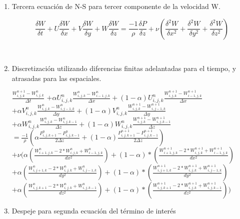 \documentclass[a4paper]{article}
\begin{document}
\begin{enumerate}

\item Tercera ecuación de N-S para tercer componente de la velocidad W.

$$ \frac{\delta W}{\delta t} + U \frac{\delta W}{\delta x} + V \frac{\delta W}{\delta y} + W \frac{\delta W}{\delta z} =  \frac{-1}{\rho} \frac{\delta P}{\delta z} + \nu (\frac{{\delta}^{2} W}{\delta {x}^{2}} + \frac{{\delta}^{2} W}{\delta {y}^{2}} + \frac{{\delta}^{2} W}{\delta {z}^{2}}) $$

~\\

\item Discretización utilizando diferencias finitas adelantadas para el tiempo, y atrasadas para las espaciales.

$ \frac{ {W}^{n+1}_{i,j,k} - W^{n}_{i,j,k}}{ \Delta t} $
$+ \alpha {U}^{n}_{i,j,k} \frac{ {W}^{n}_{i,j,k} - W^{n}_{i-1,j,k}}{\Delta x} + (1 - \alpha) {U}^{n}_{i,j,k} \frac{ {W}^{n+1}_{i,j,k} - W^{n+1}_{i-1,j,k}}{ \Delta x}$ 
\\
$+ \alpha {V}^{n}_{i,j,k} \frac{ {W}^{n}_{i,j,k} - W^{n}_{i,j-1,k}}{ \Delta y} + (1 - \alpha) {V}^{n}_{i,j,k} \frac{ {W}^{n+1}_{i,j,k} - W^{n+1}_{i,j-1,k}}{ \Delta y}$
\\
$+ \alpha {W}^{n}_{i,j,k} \frac{ {W}^{n}_{i,j,k} - W^{n}_{i,j,k-1}}{ \Delta z} + (1 - \alpha) {W}^{n}_{i,j,k} \frac{ {W}^{n+1}_{i,j,k} - W^{n+1}_{i,j,k-1}}{ \Delta z}$
\\
$= \frac{-1}{\rho} ( \alpha \frac{P^{n}_{i,j,k+1} - P^{n}_{i,j,k-1} }{ 2 \Delta z } + (1 - \alpha) \frac{P^{n+1}_{i,j,k+1} - P^{n+1}_{i,j,k-1} }{ 2 \Delta z })  $
\\
$+ \nu (\alpha (\frac{ W^{n}_{i+1,j,k} - 2*W^{n}_{i,j,k} + W^{n}_{i-1,j,k}}{dx^2}) + (1-\alpha)*(\frac{ W^{n+1}_{i+1,j,k} - 2*W^{n+1}_{i,j,k} + W^{n+1}_{i-1,j,k}}{dx^2})$
\\
$+ \alpha (\frac{ W^{n}_{i,j+1,k} - 2*W^{n}_{i,j,k} + W^{n}_{i,j-1,k}}{dy^2}) + (1-\alpha)*(\frac{ W^{n+1}_{i,j+1,k} - 2*W^{n+1}_{i,j,k} + W^{n+1}_{i,j-1,k}}{dy^2})$
\\
$ + \alpha (\frac{ W^{n}_{i,j,k+1} - 2*W^{n}_{i,j,k} + W^{n}_{i,j,k-1}}{dz^2}) + (1-\alpha)*(\frac{ W^{n+1}_{i,j,k+1} - 2*W^{n+1}_{i,j,k} + W^{n+1}_{i,j,k-1}}{dz^2}) )$
~\\


\item Despeje para segunda ecuación del término de interés


\end{enumerate}
\end{document}
